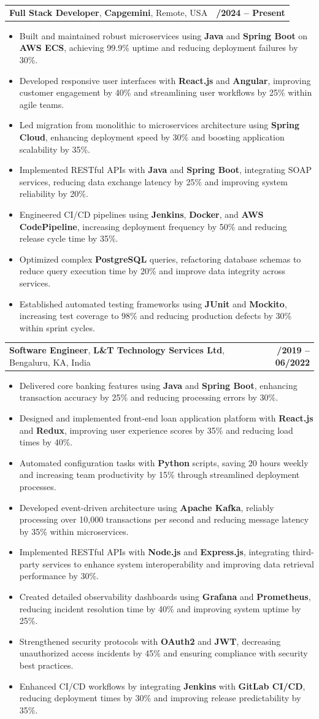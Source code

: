 \documentclass[letterpaper,11pt]{article}
\makeatletter
\newcommand{\resumeItem}[1]{
  \item\footnotesize{
    {#1 \vspace{-2pt}}
  }
}
\newcommand{\resumeSubheading}[4]{
  \vspace{-2pt}\item
    \begin{tabular*}{1.0\textwidth}[t]{l@{\extracolsep{\fill}}r}
      \textbf{\fontsize{10pt}{14pt}\selectfont #3}, \textbf{\fontsize{10pt}{14pt}\selectfont #1}, \fontsize{10pt}{14pt}\selectfont #4 & \textbf{\fontsize{10pt}{14pt}\selectfont #2} \\
    \end{tabular*}\vspace{-7pt}
}
\newcommand{\resumeItemListStart}{\begin{itemize}[leftmargin=*]}
\newcommand{\resumeItemListEnd}{\end{itemize}\vspace{-5pt}}
\makeatother
\begin{document}
    \resumeSubheading
        {Capgemini}{01/2024 -- Present}
        {Full Stack Developer}{Remote, USA}
      \resumeItemListStart
        \resumeItem{Built and maintained robust microservices using \textbf{Java} and \textbf{Spring Boot} on \textbf{AWS ECS}, achieving 99.9\% uptime and reducing deployment failures by 30\%.}
        \resumeItem{Developed responsive user interfaces with \textbf{React.js} and \textbf{Angular}, improving customer engagement by 40\% and streamlining user workflows by 25\% within agile teams.}
        \resumeItem{Led migration from monolithic to microservices architecture using \textbf{Spring Cloud}, enhancing deployment speed by 30\% and boosting application scalability by 35\%.}
        \resumeItem{Implemented RESTful APIs with \textbf{Java} and \textbf{Spring Boot}, integrating SOAP services, reducing data exchange latency by 25\% and improving system reliability by 20\%.}
        \resumeItem{Engineered CI/CD pipelines using \textbf{Jenkins}, \textbf{Docker}, and \textbf{AWS CodePipeline}, increasing deployment frequency by 50\% and reducing release cycle time by 35\%.}
        \resumeItem{Optimized complex \textbf{PostgreSQL} queries, refactoring database schemas to reduce query execution time by 20\% and improve data integrity across services.}
        \resumeItem{Established automated testing frameworks using \textbf{JUnit} and \textbf{Mockito}, increasing test coverage to 98\% and reducing production defects by 30\% within sprint cycles.}
      \resumeItemListEnd

    \resumeSubheading
        {L\&T Technology Services Ltd}{08/2019 -- 06/2022}
        {Software Engineer}{Bengaluru, KA, India}
      \resumeItemListStart
        \resumeItem{Delivered core banking features using \textbf{Java} and \textbf{Spring Boot}, enhancing transaction accuracy by 25\% and reducing processing errors by 30\%.}
        \resumeItem{Designed and implemented front-end loan application platform with \textbf{React.js} and \textbf{Redux}, improving user experience scores by 35\% and reducing load times by 40\%.}
        \resumeItem{Automated configuration tasks with \textbf{Python} scripts, saving 20 hours weekly and increasing team productivity by 15\% through streamlined deployment processes.}
        \resumeItem{Developed event-driven architecture using \textbf{Apache Kafka}, reliably processing over 10,000 transactions per second and reducing message latency by 35\% within microservices.}
        \resumeItem{Implemented RESTful APIs with \textbf{Node.js} and \textbf{Express.js}, integrating third-party services to enhance system interoperability and improving data retrieval performance by 30\%.}
        \resumeItem{Created detailed observability dashboards using \textbf{Grafana} and \textbf{Prometheus}, reducing incident resolution time by 40\% and improving system uptime by 25\%.}
        \resumeItem{Strengthened security protocols with \textbf{OAuth2} and \textbf{JWT}, decreasing unauthorized access incidents by 45\% and ensuring compliance with security best practices.}
        \resumeItem{Enhanced CI/CD workflows by integrating \textbf{Jenkins} with \textbf{GitLab CI/CD}, reducing deployment times by 30\% and improving release predictability by 35\%.}
      \resumeItemListEnd
\end{document}
